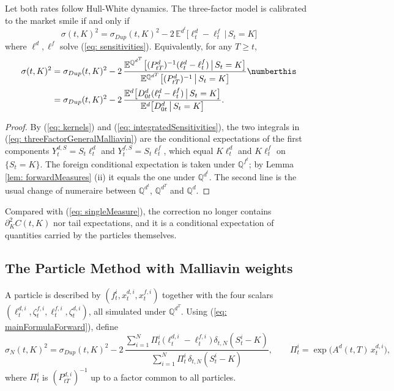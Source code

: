 \begin{prop}\label{prop: main}
Let both rates follow Hull-White dynamics. The three-factor model is calibrated to the market smile if and only if
\begin{equation}\label{eq: mainFormula}
\boxed{\;\sigma(t,K)^2=\sigma_{Dup}(t,K)^2-2\,\mathbb{E}^{d^t}\big[\ell^d_t-\ell^f_t\,\big|\,S_t=K\big]\;}
\end{equation}
where $\ell^d,\ell^f$ solve (\ref{eq: sensitivities}). Equivalently, for any $T\geq t$,
\begin{align*}
\sigma(t,K)^2&=\sigma_{Dup}(t,K)^2
-2\,\frac{\mathbb{E}^{\mathbb{Q}^{d^T}}\big[(P^d_{tT})^{-1}(\ell^d_t-\ell^f_t)\,\big|\,S_t=K\big]}{\mathbb{E}^{\mathbb{Q}^{d^T}}\big[(P^d_{tT})^{-1}\,\big|\,S_t=K\big]} \numberthis\label{eq: mainFormulaForward}\\
&=\sigma_{Dup}(t,K)^2
-2\,\frac{\mathbb{E}^{d}\big[D^d_{0t}(\ell^d_t-\ell^f_t)\,\big|\,S_t=K\big]}{\mathbb{E}^{d}\big[D^d_{0t}\,\big|\,S_t=K\big]} .
\end{align*}
\end{prop}
\begin{proof}
By (\ref{eq: kernels}) and (\ref{eq: integratedSensitivities}), the two integrals in (\ref{eq: threeFactorGeneralMalliavin}) are the conditional expectations of the first components $Y^{d,S}_t=S_t\ell^d_t$ and $Y^{f,S}_t=S_t\ell^f_t$, which equal $K\ell^d_t$ and $K\ell^f_t$ on $\{S_t=K\}$. The foreign conditional expectation is taken under $\mathbb{Q}^{f^t}$; by Lemma \ref{lem: forwardMeasures} (ii) it equals the one under $\mathbb{Q}^{d^t}$. The second line is the usual change of numeraire between $\mathbb{Q}^{d^t}$, $\mathbb{Q}^{d^T}$ and $\mathbb{Q}^d$.
\end{proof}
Compared with (\ref{eq: singleMeasure}), the correction no longer contains $\partial^2_KC(t,K)$ nor tail expectations, and it is a conditional expectation of quantities carried by the particles themselves.

\subsection{The Particle Method with Malliavin weights}
A particle is described by $(f^i_t,x^{d,i}_t,x^{f,i}_t)$ together with the four scalars $(\ell^{d,i}_t,\zeta^{f,i}_t,\ell^{f,i}_t,\zeta^{d,i}_t)$, all simulated under $\mathbb{Q}^{d^T}$. Using (\ref{eq: mainFormulaForward}), define
\begin{equation}\label{eq: particleMalliavin3F}
\sigma_N(t,K)^2=\sigma_{Dup}(t,K)^2
-2\,\frac{\sum_{i=1}^N\Pi^i_t\,\big(\ell^{d,i}_t-\ell^{f,i}_t\big)\,\delta_{t,N}(S^i_t-K)}
{\sum_{i=1}^N\Pi^i_t\,\delta_{t,N}(S^i_t-K)},\qquad \Pi^i_t=\exp\big(A^d(t,T)\,x^{d,i}_t\big),
\end{equation}
where $\Pi^i_t$ is $(P^{d,i}_{tT})^{-1}$ up to a factor common to all particles.

